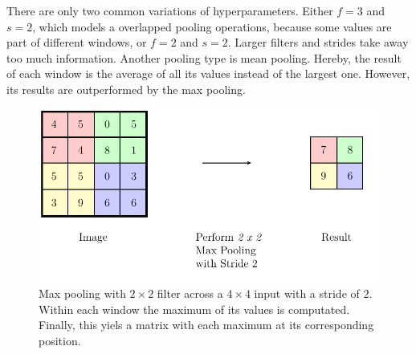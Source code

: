 There are only two common variations of hyperparameters.
Either $f=3$ and $s=2$, which models a overlapped pooling operations, because some values are part of different windows, or $f=2$ and $s=2$.
Larger filters and strides take away too much information.
Another pooling type is mean pooling.
Hereby, the result of each window is the average of all its values instead of the largest one.
However, its results are outperformed by the max pooling\cite{Scherer2010}.
\begin{figure}
	\centering
	\includegraphics{images/pooling.pdf}
	\caption[Max Pooling with $2 \times 2$ Filter and Stride $2$]{Max pooling with $2 \times 2$ filter across a $4 \times 4$ input with a stride of $2$. Within each window the maximum of its values is computated. Finally, this yiels a matrix with each maximum at its corresponding position.}
	\label{fig:pooling}
\end{figure}